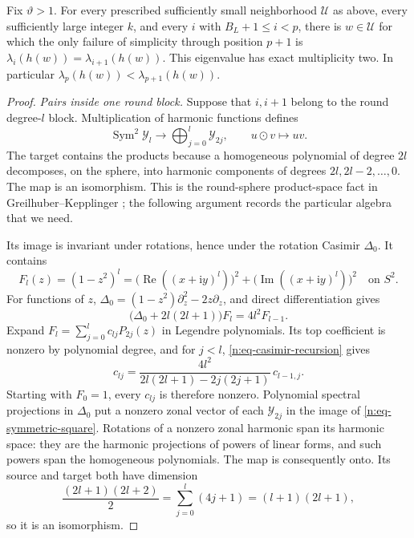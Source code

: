 \begin{lemma}\label{n:lem-adjacent-doubles}
Fix \(\vartheta>1\).  For every prescribed sufficiently small
neighborhood \(\mathcal U\) as above, every sufficiently large integer
\(k\), and every \(i\) with \(B_L+1\leq i<p\), there is
\(w\in\mathcal U\) for which
the only failure of simplicity through position \(p+1\) is
\(\lambda_i(h(w))=\lambda_{i+1}(h(w))\).  This eigenvalue has exact
multiplicity two.  In particular
\(\lambda_p(h(w))<\lambda_{p+1}(h(w))\).
\end{lemma}

\begin{proof}
\emph{Pairs inside one round block.}
Suppose that \(i,i+1\) belong to the round degree-\(l\) block.
Multiplication of harmonic functions defines
\begin{equation}\label{n:eq-symmetric-square}
 \operatorname{Sym}^2\mathcal Y_l
 \longrightarrow\bigoplus_{j=0}^l\mathcal Y_{2j},
 \qquad u\mathbin{\odot}v\longmapsto uv.
\end{equation}
The target contains the products because a homogeneous polynomial of
degree \(2l\) decomposes, on the sphere, into harmonic components of
degrees \(2l,2l-2,\ldots,0\).  The map is an isomorphism.  This is the
round-sphere product-space fact in
Greilhuber--Kepplinger \cite[Proposition~4.6]{GreilhuberKepplinger};
the following argument records the particular algebra that we need.

Its image is invariant under rotations, hence under the rotation
Casimir \(\Delta_0\).  It contains
\[
 F_l(z)=(1-z^2)^l
       =\bigl(\operatorname{Re}((x+\mathrm i y)^l)\bigr)^2
        +\bigl(\operatorname{Im}((x+\mathrm i y)^l)\bigr)^2
       \quad\text{on }S^2 .
\]
For functions of \(z\),
\(\Delta_0=(1-z^2)\partial_z^2-2z\partial_z\), and direct
differentiation gives
\begin{equation}\label{n:eq-casimir-recursion}
  \bigl(\Delta_0+2l(2l+1)\bigr)F_l=4l^2F_{l-1}.
\end{equation}
Expand \(F_l=\sum_{j=0}^l c_{lj}P_{2j}(z)\) in Legendre
polynomials.  Its top coefficient is nonzero by polynomial degree,
and for \(j<l\), \eqref{n:eq-casimir-recursion} gives
\[
 c_{lj}=
 \frac{4l^2}{2l(2l+1)-2j(2j+1)}\,c_{l-1,j}.
\]
Starting with \(F_0=1\), every \(c_{lj}\) is therefore nonzero.
Polynomial spectral projections in \(\Delta_0\) put a nonzero zonal
vector of each \(\mathcal Y_{2j}\) in the image of
\eqref{n:eq-symmetric-square}.  Rotations of a nonzero zonal harmonic
span its harmonic space: they are the harmonic projections of powers
of linear forms, and such powers span the homogeneous polynomials.
The map is consequently onto.  Its source and target both have
dimension
\[
 \frac{(2l+1)(2l+2)}2
  =\sum_{j=0}^l(4j+1)=(l+1)(2l+1),
\]
so it is an isomorphism.


\end{proof}
